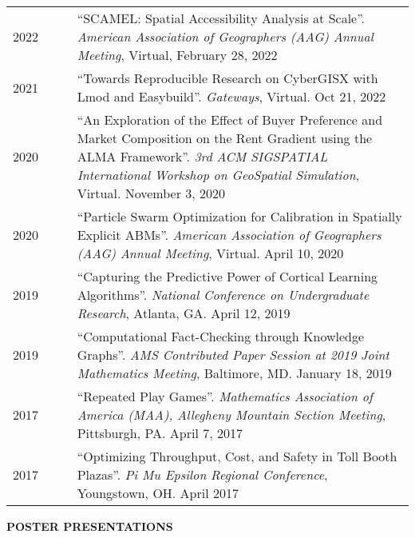 \documentclass{acmcv}
\begin{document}
    \begin{longtable}{p{0.16\linewidth} p{0.84\linewidth}}
        2022 & ``SCAMEL: Spatial Accessibility Analysis at Scale''. \textit{American Association of Geographers (AAG) Annual Meeting}, Virtual, February 28, 2022\\

        2021 & ``Towards Reproducible Research on CyberGISX with Lmod and Easybuild''. \textit{Gateways}, Virtual. Oct 21, 2022\\

        2020 & ``An Exploration of the Effect of Buyer Preference and Market Composition on the Rent Gradient using the ALMA Framework''. \textit{3rd ACM SIGSPATIAL International Workshop on GeoSpatial Simulation}, Virtual. November 3, 2020 \\

        2020 & ``Particle Swarm Optimization for Calibration in Spatially Explicit ABMs''. \textit{American Association of Geographers (AAG) Annual Meeting}, Virtual. April 10, 2020 \\

        2019 & ``Capturing the Predictive Power of Cortical Learning Algorithms''. \textit{National Conference on Undergraduate Research}, Atlanta, GA. April 12, 2019 \\

        2019 & ``Computational Fact-Checking through Knowledge Graphs''. \textit{AMS Contributed Paper Session at 2019 Joint Mathematics Meeting}, Baltimore, MD. January 18, 2019 \\

        2017 & ``Repeated Play Games''. \textit{Mathematics Association of America (MAA), Allegheny Mountain Section Meeting}, Pittsburgh, PA. April 7, 2017  \\

        2017 & ``Optimizing Throughput, Cost, and Safety in Toll Booth Plazas''. \textit{Pi Mu Epsilon Regional Conference}, Youngstown, OH. April 2017 \\
    \end{longtable}
    
    \vspace{0.15cm}\textbf{\uppercase{Poster Presentations}}
\end{document}
